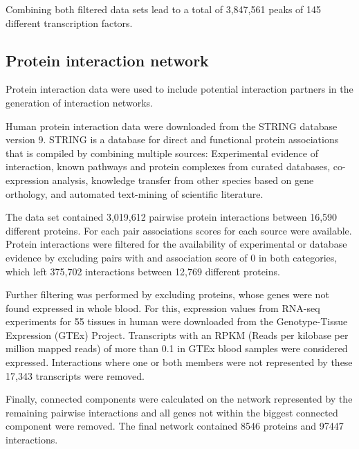 \documentclass[a4paper,12pt,twoside,openright]{article}
\begin{document}
Combining both filtered data sets lead to a total of 3,847,561 peaks of 145 different transcription factors.

\subsection{Protein interaction network}
\label{Data:Protein interaction network}
Protein interaction data were used to include potential interaction partners in the generation of interaction networks.

Human protein interaction data were downloaded from the STRING database version 9\cite{Franceschini2013}. STRING is a database for direct and functional protein associations that is compiled by combining multiple sources: Experimental evidence of interaction, known pathways and protein complexes from curated databases, co-expression analysis, knowledge transfer from other species based on gene orthology, and automated text-mining of scientific literature\cite{Szklarczyk2017}. 

The data set contained 3,019,612 pairwise protein interactions between 16,590 different proteins. For each pair associations scores for each source were available. Protein interactions were filtered for the availability of experimental or database evidence by excluding pairs with and association score of 0 in both categories, which left 375,702 interactions between 12,769 different proteins. 

Further filtering was performed by excluding proteins, whose genes were not found expressed in whole blood. For this, expression values from RNA-seq experiments for 55 tissues in human were downloaded from the  Genotype-Tissue Expression (GTEx) Project\cite{GTExConsortium2013}. Transcripts with an RPKM (Reads per kilobase per million mapped reads) of more than 0.1 in GTEx blood samples were considered expressed. Interactions where one or both members were not represented by these 17,343 transcripts were removed.

Finally, connected components were calculated on the network represented by the remaining pairwise interactions and all genes not within the biggest connected component were removed. The final network contained 8546 proteins and 97447 interactions. 

\end{document}
